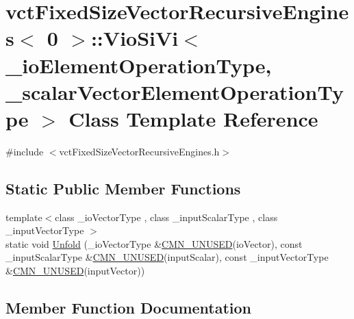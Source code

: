 \hypertarget{classvct_fixed_size_vector_recursive_engines_3_010_01_4_1_1_vio_si_vi}{}\section{vct\+Fixed\+Size\+Vector\+Recursive\+Engines$<$ 0 $>$\+:\+:Vio\+Si\+Vi$<$ \+\_\+io\+Element\+Operation\+Type, \+\_\+scalar\+Vector\+Element\+Operation\+Type $>$ Class Template Reference}
\label{classvct_fixed_size_vector_recursive_engines_3_010_01_4_1_1_vio_si_vi}


{\ttfamily \#include $<$vct\+Fixed\+Size\+Vector\+Recursive\+Engines.\+h$>$}

\subsection*{Static Public Member Functions}
\begin{DoxyCompactItemize}
\item 
{\footnotesize template$<$class \+\_\+io\+Vector\+Type , class \+\_\+input\+Scalar\+Type , class \+\_\+input\+Vector\+Type $>$ }\\static void \hyperlink{classvct_fixed_size_vector_recursive_engines_3_010_01_4_1_1_vio_si_vi_a59f751d60e4f1665c4de4bceeb939306}{Unfold} (\+\_\+io\+Vector\+Type \&\hyperlink{cmn_portability_8h_a021894e2626935fa2305434b1e893ff6}{C\+M\+N\+\_\+\+U\+N\+U\+S\+E\+D}(io\+Vector), const \+\_\+input\+Scalar\+Type \&\hyperlink{cmn_portability_8h_a021894e2626935fa2305434b1e893ff6}{C\+M\+N\+\_\+\+U\+N\+U\+S\+E\+D}(input\+Scalar), const \+\_\+input\+Vector\+Type \&\hyperlink{cmn_portability_8h_a021894e2626935fa2305434b1e893ff6}{C\+M\+N\+\_\+\+U\+N\+U\+S\+E\+D}(input\+Vector))
\end{DoxyCompactItemize}


\subsection{Member Function Documentation}
\hypertarget{classvct_fixed_size_vector_recursive_engines_3_010_01_4_1_1_vio_si_vi_a59f751d60e4f1665c4de4bceeb939306}{}
